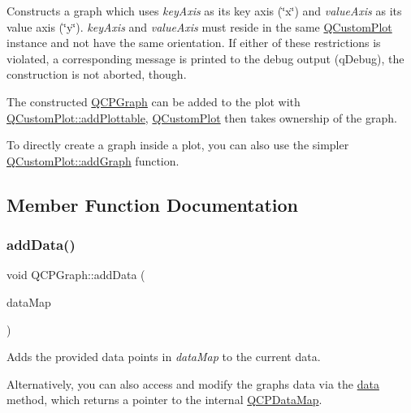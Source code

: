 Constructs a graph which uses {\itshape key\+Axis} as its key axis (\char`\"{}x\char`\"{}) and {\itshape value\+Axis} as its value axis (\char`\"{}y\char`\"{}). {\itshape key\+Axis} and {\itshape value\+Axis} must reside in the same \mbox{\hyperlink{class_q_custom_plot}{Q\+Custom\+Plot}} instance and not have the same orientation. If either of these restrictions is violated, a corresponding message is printed to the debug output (q\+Debug), the construction is not aborted, though.

The constructed \mbox{\hyperlink{class_q_c_p_graph}{Q\+C\+P\+Graph}} can be added to the plot with \mbox{\hyperlink{class_q_custom_plot_ab7ad9174f701f9c6f64e378df77927a6}{Q\+Custom\+Plot\+::add\+Plottable}}, \mbox{\hyperlink{class_q_custom_plot}{Q\+Custom\+Plot}} then takes ownership of the graph.

To directly create a graph inside a plot, you can also use the simpler \mbox{\hyperlink{class_q_custom_plot_a6fb2873d35a8a8089842d81a70a54167}{Q\+Custom\+Plot\+::add\+Graph}} function. 

\subsection{Member Function Documentation}
\mbox{\label{class_q_c_p_graph_aa5c6181d84db72ce4dbe9dc15a34ef4f}} 
\subsubsection{\texorpdfstring{add\+Data()}{addData()}\hspace{0.1cm}{\footnotesize\ttfamily [1/4]}}
{\footnotesize\ttfamily void Q\+C\+P\+Graph\+::add\+Data (\begin{DoxyParamCaption}\item[{const \mbox{\hyperlink{qcustomplot_8h_a84a9c4a4c2216ccfdcb5f3067cda76e3}{Q\+C\+P\+Data\+Map}} \&}]{data\+Map }\end{DoxyParamCaption})}

Adds the provided data points in {\itshape data\+Map} to the current data.

Alternatively, you can also access and modify the graph\textquotesingle{}s data via the \mbox{\hyperlink{class_q_c_p_graph_acde1c0d1f6a817930489548396e6b3e6}{data}} method, which returns a pointer to the internal \mbox{\hyperlink{qcustomplot_8h_a84a9c4a4c2216ccfdcb5f3067cda76e3}{Q\+C\+P\+Data\+Map}}.

